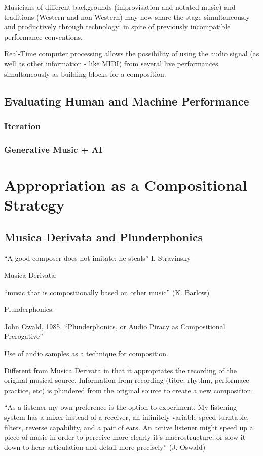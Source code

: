 Musicians of different backgrounds (improvisation and notated music) and traditions (Western and non-Western) may now share the stage simultaneously and productively through technology; in spite of previously incompatible performance conventions.

Real-Time computer processing allows the possibility of using the audio signal (as well as other information - like MIDI) from several live performances simultaneously as building blocks for a composition.

\subsection{Evaluating Human and Machine Performance}
\subsubsection {Iteration}
\subsubsection {Generative Music + AI}

\section{Appropriation as a Compositional Strategy}

\subsection{Musica Derivata and Plunderphonics}

``A good composer does not imitate; he steals''       I. Stravinsky

Musica Derivata:

``music that is compositionally based on other music'' (K. Barlow) 

Plunderphonics:

John Owald, 1985. ``Plunderphonics, or Audio Piracy as Compositional Prerogative''

Use of audio samples as a technique for composition. 

Different from Musica Derivata in that it appropriates the recording of the original musical source. Information from recording (tibre, rhythm, performace practice, etc) is plundered from the original source to create a new composition.

``As a listener my own preference is the option to experiment. My listening system has a mixer instead of a receiver, an infinitely variable speed turntable, filters, reverse capability, and a pair of ears. An active listener might speed up a piece of music in order to perceive more clearly it’s macrostructure, or slow it down to hear articulation and detail more precisely'' (J. Oswald)

